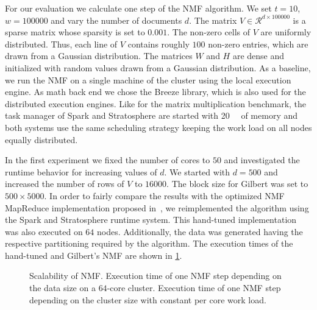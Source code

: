 For our evaluation we calculate one step of the NMF algorithm.
We set $t=10$, $w=100000$ and vary the number of documents $d$.
The matrix $V\in\mathcal{R}^{d\times 100000}$ is a sparse matrix whose sparsity is set to $0.001$.
The non-zero cells of $V$ are uniformly distributed.
Thus, each line of $V$ contains roughly $100$ non-zero entries, which are drawn from a Gaussian distribution.
The matrices $W$ and $H$ are dense and initialized with random values drawn from a Gaussian distribution.
As a baseline, we run the NMF on a single machine of the cluster using the local execution engine.
As math back end we chose the Breeze library, which is also used for the distributed execution engines.
Like for the matrix multiplication benchmark, the task manager of Spark and Stratosphere are started with \SI{20}{\giga\byte} of memory and both systems use the same scheduling strategy keeping the work load on all nodes equally distributed.

In the first experiment we fixed the number of cores to $50$ and investigated the runtime behavior for increasing values of $d$.
We started with $d=500$ and increased the number of rows of $V$ to $16000$.
The block size for Gilbert was set to $500 \times 5000$.
In order to fairly compare the results with the optimized NMF MapReduce implementation proposed in~\cite{liu:2010a}, we reimplemented the algorithm using the Spark and Stratosphere runtime system.
This hand-tuned implementation was also executed on $64$ nodes.
Additionally, the data was generated having the respective partitioning required by the algorithm.
The execution times of the hand-tuned and Gilbert's NMF are shown in \cref{fig:nmfLoadRuntime}.

\begin{figure}
	\centering
	\begin{subfigure}{\dualpgfwidth}
		\caption{}
		\label{fig:nmfLoadRuntime}
	\end{subfigure}
	\begin{subfigure}{\dualpgfwidth}
		\caption{}
		\label{fig:nmfNodesRuntime}
	\end{subfigure}
	\caption{Scalability of NMF.  Execution time of one NMF step depending on the data size on a $64$-core cluster.  Execution time of one NMF step depending on the cluster size with constant per core work load.}
	\label{fig:nmfBenchmark}
\end{figure}

